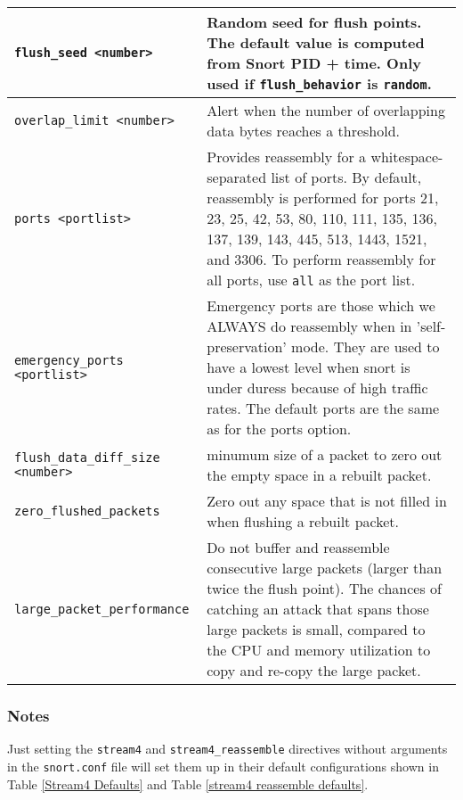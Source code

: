 \documentclass[english]{report}
\begin{document}
\begin{tabular}{| p{} | p{} |}
\hline
\texttt{flush\_seed <number>} & Random seed for flush points.  The default value is computed from Snort PID + time.  Only used if \texttt{flush\_behavior} is \texttt{random}. \\
\hline
\texttt{overlap\_limit <number>} & Alert when the number of overlapping data bytes reaches a threshold.\\
\hline
\texttt{ports <portlist>} & Provides reassembly for a
whitespace-separated list of ports.  By default, reassembly is performed
for ports 21, 23, 25, 42, 53, 80, 110, 111, 135, 136, 137, 139, 143, 445,
513, 1443, 1521, and 3306. To perform reassembly for all ports, use
\texttt{all} as the port list.\\
\hline
\texttt{emergency\_ports <portlist>} & Emergency ports are those which we ALWAYS do reassembly when in 'self-preservation' mode. They are used to have a lowest level when snort is under duress because of high traffic rates. The default ports are the same as for the ports option.\\
\hline
\texttt{flush\_data\_diff\_size <number>} & minumum size of a packet to zero out the empty space in a rebuilt packet. \\
\hline
\texttt{zero\_flushed\_packets} & Zero out any space that is not filled in when flushing a rebuilt packet.\\
\hline
\texttt{large\_packet\_performance} & Do not buffer and reassemble consecutive large packets (larger than twice the flush point). The chances of catching an attack that spans those large packets is small, compared to the CPU and memory utilization to copy and re-copy the large packet.\\
\hline
\end{tabular}

\subsubsection{Notes}

Just setting the \texttt{stream4} and \texttt{stream4\_reassemble} directives without
arguments in the \texttt{snort.conf} file will set them up in their default
configurations shown in Table \ref{Stream4 Defaults} and Table \ref{stream4 reassemble defaults}.

\vspace{-30pt}
\end{document}

